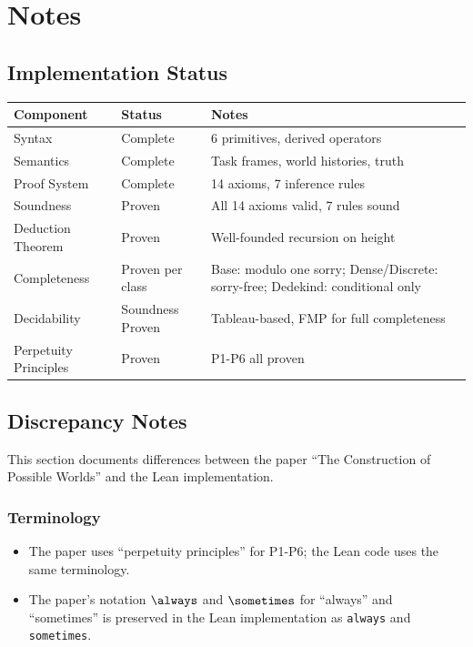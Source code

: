 \documentclass[../BimodalReference.tex]{subfiles}
\begin{document}
\section{Notes}

\subsection{Implementation Status}

\begin{center}
\begin{tabular}{@{}lll@{}}
\toprule
Component & Status & Notes \\
\midrule
Syntax & Complete & 6 primitives, derived operators \\
Semantics & Complete & Task frames, world histories, truth \\
Proof System & Complete & 14 axioms, 7 inference rules \\
Soundness & Proven & All 14 axioms valid, 7 rules sound \\
Deduction Theorem & Proven & Well-founded recursion on height \\
Completeness & Proven per class & Base: modulo one sorry; Dense/Discrete: sorry-free; Dedekind: conditional only \\
Decidability & Soundness Proven & Tableau-based, FMP for full completeness \\
Perpetuity Principles & Proven & P1-P6 all proven \\
\bottomrule
\end{tabular}
\end{center}

\subsection{Discrepancy Notes}

This section documents differences between the paper ``The Construction of Possible Worlds'' and the Lean implementation.

\subsubsection{Terminology}

\begin{itemize}
  \item The paper uses ``perpetuity principles'' for P1-P6; the Lean code uses the same terminology.
  \item The paper's notation $\always$ and $\sometimes$ for ``always'' and ``sometimes''
        is preserved in the Lean implementation as \texttt{always} and \texttt{sometimes}.
\end{itemize}
\end{document}
